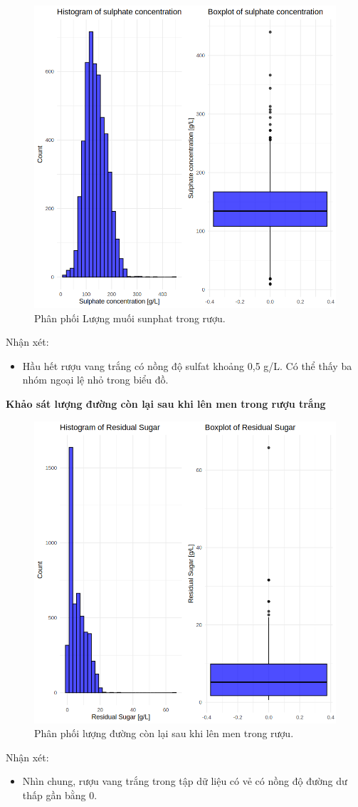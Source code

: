\begin{figure}[H]
    \centering
    \includegraphics[width=0.75\columnwidth]{wine_figures/white_sulphate.png}
    \caption{Phân phối Lượng muối sunphat trong rượu.}
    \label{fig:white_sulphate}
\end{figure}
Nhận xét:
\begin{itemize}
    \item Hầu hết rượu vang trắng có nồng độ sulfat khoảng 0,5 g/L. Có thể thấy ba nhóm ngoại lệ nhỏ trong biểu đồ.
\end{itemize}

\textbf{Khảo sát lượng đường còn lại sau khi lên men trong rượu trắng}
\begin{figure}[H]
    \centering
    \includegraphics[width=0.75\columnwidth]{wine_figures/white_sugar.png}
    \caption{Phân phối lượng đường còn lại sau khi lên men trong rượu.}
    \label{fig:white_sugar}
\end{figure}
Nhận xét:
\begin{itemize}
    \item Nhìn chung, rượu vang trắng trong tập dữ liệu có vẻ có nồng độ đường dư thấp gần bằng 0. 
\end{itemize}

